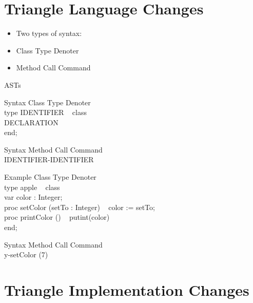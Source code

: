 \documentclass{beamer}
\begin{document}
\section{Triangle Language Changes}
\begin{frame}
	\begin{itemize}
	\item
	Two types of syntax:
	\item
	Class Type Denoter
	\item
	Method Call Command
	\end{itemize}
\end{frame}

\begin{frame}{ASTs}
\end{frame}

\begin{frame}{Syntax}
\alert{Class Type Denoter} \\
type IDENTIFIER ~ class\\
	DECLARATION\\
	end;
\end{frame}

\begin{frame}{Syntax}
\alert{Method Call Command} \\
IDENTIFIER-IDENTIFIER\\
\end{frame}

\begin{frame}{Example}
\alert{Class Type Denoter} \\
	type apple ~ class\\
		var color : Integer;\\
		proc setColor (setTo : Integer) ~ color := setTo;\\
		proc printColor () ~ putint(color)\\
		end;
\end{frame}

\begin{frame}{Syntax}
\alert{Method Call Command} \\
	y-setColor (7)
\end{frame}


\section{Triangle Implementation Changes}
\end{document}
